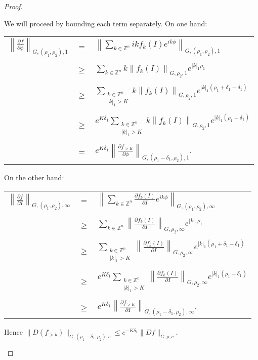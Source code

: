 \begin{proof}
\begin{enumerate}
We will proceed by bounding each term separately. On one hand:

\begin{longtable}{rcl}
$\displaystyle\left\|\frac{\partial f}{\partial \phi}\right\|_{G,(\rho_1,\rho_2),1}$ & $=$ & $\displaystyle \left\|\sum_{k\in\mathbb{Z}^n} ikf_k(I)e^{ik\phi}\right\|_{G,(\rho_1,\rho_2),1}$\\
\\
& $\geq$ & $\displaystyle \sum_{k\in\mathbb{Z}^n} k\left\|f_k(I)\right\|_{G,\rho_2,1}e^{|k|_1\rho_1}$\\
\\
& $\geq$ & $\displaystyle \sum_{\substack{k\in\mathbb{Z}^n \\ |k|_1 > K}} k\left\|f_k(I)\right\|_{G,\rho_2,1}e^{|k|_1(\rho_1 + \delta_1 - \delta_1)}$\\
\\
& $\geq$ & $\displaystyle e^{K \delta_1}\sum_{\substack{k\in\mathbb{Z}^n \\ |k|_1 > K}} k\left\|f_k(I)\right\|_{G,\rho_2,1}e^{|k|_1(\rho_1 - \delta_1)}$\\
\\
& $=$ & $\displaystyle e^{K \delta_1}\left\|\frac{\partial f_{>K}}{\partial \phi}\right\|_{G,(\rho_1-\delta_1,\rho_2),1}.$\\
\end{longtable}


On the other hand:

\begin{longtable}{rcl}
$\displaystyle \left\|\frac{\partial f}{\partial I}\right\|_{G,(\rho_1,\rho_2),\infty}$& $=$ & $\displaystyle \left\|\sum_{k \in \mathbb{Z}^n} \frac{\partial f_k(I)}{\partial I} e^{ik\phi}\right\|_{G,(\rho_1,\rho_2),\infty}$\\
\\
& $\geq$ & $\displaystyle \sum_{k \in \mathbb{Z}^n} \left\|\frac{\partial f_k(I)}{\partial I}\right\|_{G,\rho_2,\infty} e^{|k|_1\rho_1}$ \\
\\
& $\geq$ & $\displaystyle \sum_{\substack{k\in\mathbb{Z}^n \\ |k|_1 > K}} \left\|\frac{\partial f_k(I)}{\partial I}\right\|_{G,\rho_2,\infty} e^{|k|_1(\rho_1 + \delta_1 - \delta_1)}$ \\
\\
& $\geq$ & $\displaystyle e^{K\delta_1}\sum_{\substack{k\in\mathbb{Z}^n \\ |k|_1 > K}} \left\|\frac{\partial f_k(I)}{\partial I}\right\|_{G,\rho_2,\infty} e^{|k|_1(\rho_1 - \delta_1)}$\\
\\
& $\geq$ & $\displaystyle e^{K\delta_1}\left\|\frac{\partial f_{>K}}{\partial I}\right\|_{G,(\rho_1-\delta_1,\rho_2),\infty}.$\\
\end{longtable}


Hence $\|D(f_{>k})\|_{G,(\rho_1-\delta_1,\rho_2),c} \leq e^{-K\delta_1}\|Df\|_{G,\rho,c}$.

\end{enumerate}
\end{proof}

